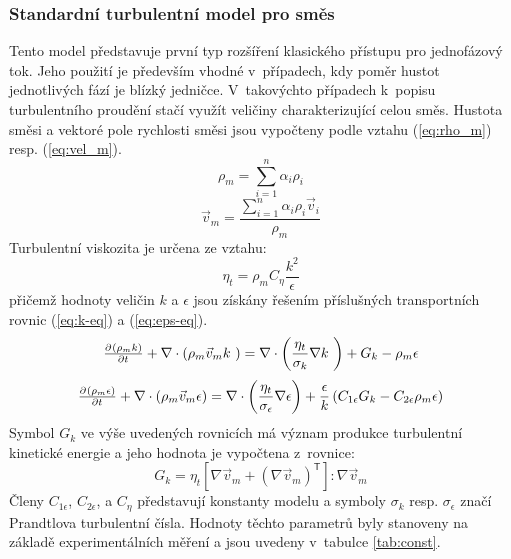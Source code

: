 \subsubsection{Standardní \kepsb{} turbulentní model pro směs}
Tento model představuje první typ rozšíření klasického \keps{} přístupu pro jednofázový tok. Jeho použití je především vhodné v~případech, kdy poměr hustot jednotlivých fází je blízký jedničce. V~takovýchto případech k~popisu turbulentního proudění stačí využít veličiny charakterizující celou směs. Hustota směsi a vektoré pole rychlosti směsi jsou vypočteny podle vztahu (\ref{eq:rho_m}) resp. (\ref{eq:vel_m}).
\begin{equation}
	\rho_{m} = \sum_{i=1}^n \alpha_{i}\rho_{i}
	\label{eq:rho_m}
\end{equation}  
\begin{equation}
	\vec{v}_{m} = \frac{\sum_{i=1}^n \alpha_{i}\rho_{i}\vec{v}_{i}}{\rho_{m} }
	\label{eq:vel_m}
\end{equation}  
Turbulentní viskozita je určena ze vztahu:
\begin{equation}
	\eta_{t} = \rho_{m}C_{\eta}\frac{k^{2}}{\epsilon}
	\label{eq:turb}
\end{equation}  
přičemž hodnoty veličin $k$ a $\epsilon$ jsou získány řešením příslušných transportních rovnic (\ref{eq:k-eq}) a (\ref{eq:eps-eq}).
\begin{equation}
	\pd{\kula{\rho_{m}k}}{t} +  \nabla  \cdot \left( \rho_{m} \vec{v}_{m} k~\right) = \nabla  \cdot \left( \frac{\eta_{t}}{\sigma_{k}} \nabla k~\right) + G_{k} - \rho_{m}\epsilon
	\label{eq:k-eq}
\end{equation}  
\begin{equation}
	\pd{\kula{\rho_{m}\epsilon}}{t} +  \nabla  \cdot \left( \rho_{m} \vec{v}_{m} \epsilon \right) = \nabla  \cdot \left( \frac{\eta_{t}}{\sigma_{\epsilon}} \nabla \epsilon \right) + \frac{\epsilon}{k} \left( C_{1\epsilon}G_{k} - C_{2\epsilon}\rho_{m}\epsilon \right)
	\label{eq:eps-eq}
\end{equation}  
Symbol $G_{k}$ ve výše uvedených rovnicích má význam produkce turbulentní kinetické energie a jeho hodnota je vypočtena z~rovnice:
\begin{equation}
   G_{k} = \eta_{t} \left[ \nabla \vec{v}_{m} +  \left( \nabla \vec{v}_{m} \right)^{\mathsf{T}}\right] : \nabla \vec{v}_{m} 
  \label{eq:gk}
\end{equation} 
Členy $C_{1\epsilon}$, $C_{2\epsilon}$, a $C_{\eta}$ představují konstanty modelu a symboly $\sigma_{k}$ resp. $\sigma_{\epsilon}$ značí Prandt\-lo\-va turbulentní čísla. Hodnoty těchto parametrů byly stanoveny na základě experimentálních měření a jsou uvedeny v~tabulce \ref{tab:const}.

